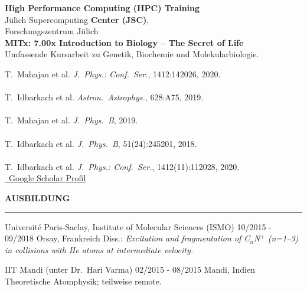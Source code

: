 \documentclass{thejus_cv}
\begin{document}
\begin{paracol}{2}
\textbf{High Performance Computing (HPC) Training}\\
J\"ulich Supercomputing \textbf{Center (JSC)},\\
Forschungszentrum J\"ulich\\[0.3cm]

\textbf{MITx: 7.00x Introduction to Biology -- The Secret of Life}\\
{\small Umfassende Kursarbeit zu Genetik, Biochemie und Molekularbiologie.}\\[0.4cm]


{\small
T.~Mahajan et al. \textit{J.~Phys.: Conf.~Ser.}, 1412:142026, 2020.\\[0.15cm]
{\color{cvlightgray}\hdashrule{\linewidth}{0.5pt}{1mm}}\\[0.15cm]
T.~Idbarkach et al. \textit{Astron.~Astrophys.}, 628:A75, 2019.\\[0.15cm]
{\color{cvlightgray}\hdashrule{\linewidth}{0.5pt}{1mm}}\\[0.15cm]
T.~Mahajan et al. \textit{J.~Phys.~B}, 2019.\\[0.15cm]
{\color{cvlightgray}\hdashrule{\linewidth}{0.5pt}{1mm}}\\[0.15cm]
T.~Idbarkach et al. \textit{J.~Phys.~B}, 51(24):245201, 2018.\\[0.15cm]
{\color{cvlightgray}\hdashrule{\linewidth}{0.5pt}{1mm}}\\[0.15cm]
T.~Idbarkach et al. \textit{J.~Phys.: Conf.~Ser.}, 1412(11):112028, 2020.
}\\[0.1cm]
\href{https://scholar.google.com/citations?user=PJkZwAwAAAAJ}{\faGraduationCap\ Google Scholar Profil}


\end{paracol}

\begin{center}
    \vspace{0.1em}
    {\Large\textbf{AUSBILDUNG}}\\
    {\color{cvtext}\rule{0.5\linewidth}{1.5pt}}\par
    \vspace{0.3em}
\end{center}

\begin{minipage}[t]{0.48\textwidth}
             {Universit\'e Paris-Saclay, Institute of Molecular Sciences (ISMO)}
             {10/2015 - 09/2018}
             {Orsay, Frankreich}
             {{\small Diss.: \textit{Excitation and fragmentation of C$_n$N$^+$ (n=1--3) in collisions with He atoms at intermediate velocity.}}}
\end{minipage}%
\hfill
\begin{minipage}[t]{0.48\textwidth}
             {IIT Mandi (unter Dr.~Hari Varma)}
             {02/2015 - 08/2015}
             {Mandi, Indien}
             {{\small Theoretische Atomphysik; teilweise remote.}}
\end{minipage}
\end{document}
